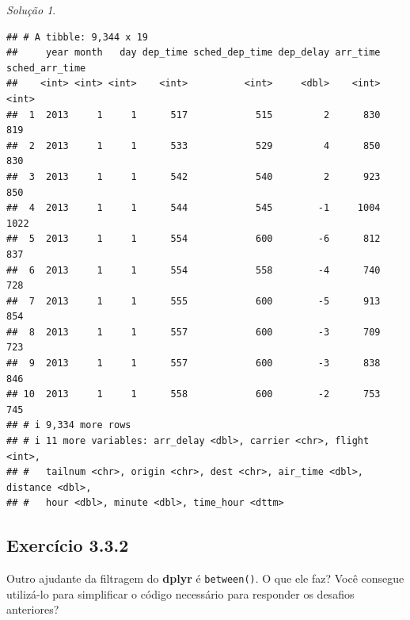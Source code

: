\documentclass[
]{latex/krantz}
\theoremstyle{definition}
\theoremstyle{definition}
\theoremstyle{definition}
\theoremstyle{definition}
\theoremstyle{remark}
\newtheorem*{solution}{Solução}
\begin{document}
\begin{solution}
\begin{verbatim}
## # A tibble: 9,344 x 19
##     year month   day dep_time sched_dep_time dep_delay arr_time sched_arr_time
##    <int> <int> <int>    <int>          <int>     <dbl>    <int>          <int>
##  1  2013     1     1      517            515         2      830            819
##  2  2013     1     1      533            529         4      850            830
##  3  2013     1     1      542            540         2      923            850
##  4  2013     1     1      544            545        -1     1004           1022
##  5  2013     1     1      554            600        -6      812            837
##  6  2013     1     1      554            558        -4      740            728
##  7  2013     1     1      555            600        -5      913            854
##  8  2013     1     1      557            600        -3      709            723
##  9  2013     1     1      557            600        -3      838            846
## 10  2013     1     1      558            600        -2      753            745
## # i 9,334 more rows
## # i 11 more variables: arr_delay <dbl>, carrier <chr>, flight <int>,
## #   tailnum <chr>, origin <chr>, dest <chr>, air_time <dbl>, distance <dbl>,
## #   hour <dbl>, minute <dbl>, time_hour <dttm>
\end{verbatim}

\end{solution}

\hypertarget{exr3-3-2}{%
\subsection*{Exercício 3.3.2}\label{exr3-3-2}}

Outro ajudante da filtragem do \textbf{dplyr} é \texttt{between()}. O que ele faz? Você consegue utilizá-lo para simplificar o código necessário para responder os desafios anteriores?
\end{document}
